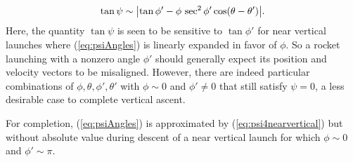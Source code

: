 \documentclass[11pt]{thesis}
\numberwithin{equation}{section}
\begin{document}
\begin{equation}
\tan\psi \sim \abs{\tan\phi' -  \phi\,\sec^2 \phi' \cos(\theta - \theta')}. \label{eq:psi4nearvertical}
\end{equation}
Here, the quantity $\tan\psi$ is seen to be sensitive to $\tan\phi'$ for near vertical launches where (\ref{eq:psiAngles}) is linearly expanded in favor of $\phi$. So a rocket launching with a nonzero angle $\phi'$ should generally expect its position and velocity vectors to be misaligned. However, there are indeed particular combinations of $\phi, \theta, \phi', \theta'$ with $\phi \sim 0$ and $\phi' \neq 0$ that still satisfy $\psi = 0$, a less desirable case to complete vertical ascent.

For completion, (\ref{eq:psiAngles}) is approximated by (\ref{eq:psi4nearvertical}) but without absolute value during descent of a near vertical launch for which $\phi \sim 0$ and $\phi' \sim \pi$.
\end{document}
